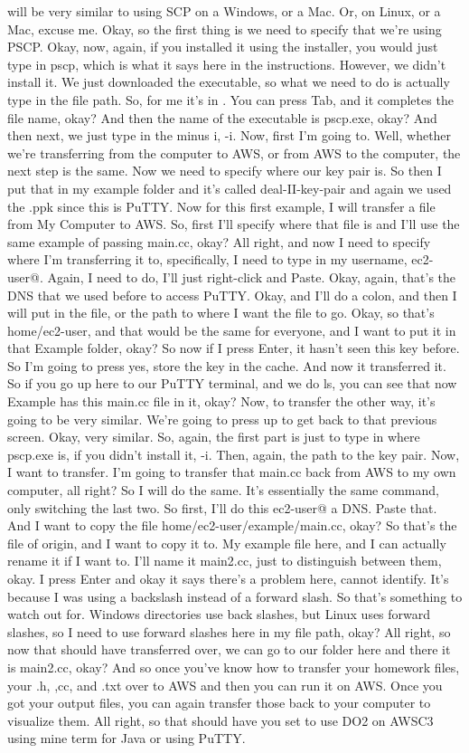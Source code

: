 \documentclass[10pt]{article}
\begin{document}
will be very similar to using SCP on a Windows, or a Mac. Or, on Linux, or a Mac, excuse me. Okay, so the first thing is we need to specify that we're using PSCP. Okay, now, again, if you installed it using the installer, you would just type in pscp, which is what it says here in the instructions. However, we didn't install it. We just downloaded the executable, so what we need to do is actually type in the file path. So, for me it's in . You can press Tab, and it completes the file name, okay? And then the name of the executable is pscp.exe, okay? And then next, we just type in the minus i, -i. Now, first I'm going to. Well, whether we're transferring from the computer to AWS, or from AWS to the computer, the next step is the same. Now we need to specify where our key pair is. So then I put that in my example folder and it's called deal-II-key-pair and again we used the .ppk since this is PuTTY. Now for this first example, I will transfer a file from My Computer to AWS. So, first I'll specify where that file is and I'll use the same example of passing main.cc, okay? All right, and now I need to specify where I'm transferring it to, specifically, I need to type in my username, ec2-user@. Again, I need to do, I'll just right-click and Paste. Okay, again, that's the DNS that we used before to access PuTTY. Okay, and I'll do a colon, and then I will put in the file, or the path to where I want the file to go. Okay, so that's home/ec2-user, and that would be the same for everyone, and I want to put it in that Example folder, okay? So now if I press Enter, it hasn't seen this key before. So I'm going to press yes, store the key in the cache. And now it transferred it. So if you go up here to our PuTTY terminal, and we do ls, you can see that now Example has this main.cc file in it, okay? Now, to transfer the other way, it's going to be very similar. We're going to press up to get back to that previous screen. Okay, very similar. So, again, the first part is just to type in where pscp.exe is, if you didn't install it, -i. Then, again, the path to the key pair. Now, I want to transfer. I'm going to transfer that main.cc back from AWS to my own computer, all right? So I will do the same. It's essentially the same command, only switching the last two. So first, I'll do this ec2-user@ a DNS. Paste that. And I want to copy the file home/ec2-user/example/main.cc, okay? So that's the file of origin, and I want to copy it to. My example file here, and I can actually rename it if I want to. I'll name it main2.cc, just to distinguish between them, okay. I press Enter and okay it says there's a problem here, cannot identify. It's because I was using a backslash instead of a forward slash. So that's something to watch out for. Windows directories use back slashes, but Linux uses forward slashes, so I need to use forward slashes here in my file path, okay? All right, so now that should have transferred over, we can go to our folder here and there it is main2.cc, okay? And so once you've know how to transfer your homework files, your .h, ,cc, and .txt over to AWS and then you can run it on AWS. Once you got your output files, you can again transfer those back to your computer to visualize them. All right, so that should have you set to use DO2 on AWSC3 using mine term for Java or using PuTTY. 
\end{document}
